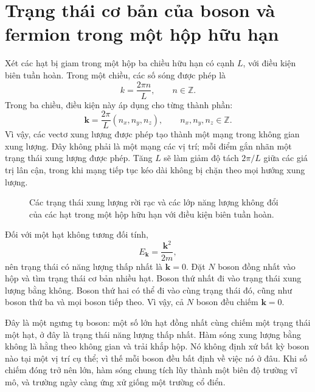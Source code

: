 \section{Trạng thái cơ bản của boson và fermion trong một hộp hữu hạn}

Xét các hạt bị giam trong một hộp ba chiều hữu hạn có cạnh \(L\), với điều kiện biên tuần hoàn. Trong một chiều, các số sóng được phép là
\begin{equation}
k=\frac{2\pi n}{L},
\qquad n\in\mathbb{Z}.
\end{equation}
Trong ba chiều, điều kiện này áp dụng cho từng thành phần:
\begin{equation}
\mathbf{k}=\frac{2\pi}{L}(n_x,n_y,n_z),
\qquad n_x,n_y,n_z\in\mathbb{Z}.
\end{equation}
Vì vậy, các vectơ xung lượng được phép tạo thành một mạng trong không gian xung lượng. Đây không phải là một mạng các vị trí; mỗi điểm gắn nhãn một trạng thái xung lượng được phép. Tăng \(L\) sẽ làm giảm độ tách \(2\pi/L\) giữa các giá trị lân cận, trong khi mạng tiếp tục kéo dài không bị chặn theo mọi hướng xung lượng.

\begin{figure}
\centering
{}
\caption{Các trạng thái xung lượng rời rạc và các lớp năng lượng không đổi của các hạt trong một hộp hữu hạn với điều kiện biên tuần hoàn.}
\end{figure}

Đối với một hạt không tương đối tính,
\begin{equation}
E_{\mathbf{k}}=\frac{\mathbf{k}^2}{2m},
\end{equation}
nên trạng thái có năng lượng thấp nhất là \(\mathbf{k}=0\). Đặt \(N\) boson đồng nhất vào hộp và tìm trạng thái cơ bản nhiều hạt. Boson thứ nhất đi vào trạng thái xung lượng bằng không. Boson thứ hai có thể đi vào cùng trạng thái đó, cũng như boson thứ ba và mọi boson tiếp theo. Vì vậy, cả \(N\) boson đều chiếm \(\mathbf{k}=0\).

Đây là một ngưng tụ boson: một số lớn hạt đồng nhất cùng chiếm một trạng thái một hạt, ở đây là trạng thái năng lượng thấp nhất. Hàm sóng xung lượng bằng không là hằng theo không gian và trải khắp hộp. Nó không định xứ bất kỳ boson nào tại một vị trí cụ thể; vì thế mỗi boson đều bất định về việc nó ở đâu. Khi số chiếm đóng trở nên lớn, hàm sóng chung tích lũy thành một biên độ trường vĩ mô, và trường ngày càng ứng xử giống một trường cổ điển.

